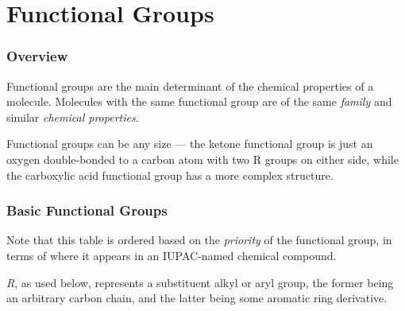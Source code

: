 

\pagebreak
\hypertarget{ChapterFunctionalGroups}{}
\part{Functional Groups}

	\section{Overview}

		Functional groups are the main determinant of the chemical properties of a molecule. Molecules with the
		same functional group are of the same \textit{family} and similar \textit{chemical properties}.

		Functional groups can be any size --- the ketone functional group is just an oxygen double-bonded to a carbon atom
		with two R groups on either side, while the carboxylic acid functional group has a more complex structure.


	\section{Basic Functional Groups}

		Note that this table is ordered based on the \textit{priority} of the functional group, in terms of where it appears in
		an IUPAC-named chemical compound.

		\textit{R}, as used below, represents a substituent alkyl or aryl group, the former being an arbitrary carbon chain, and the
		latter being some aromatic ring derivative.

